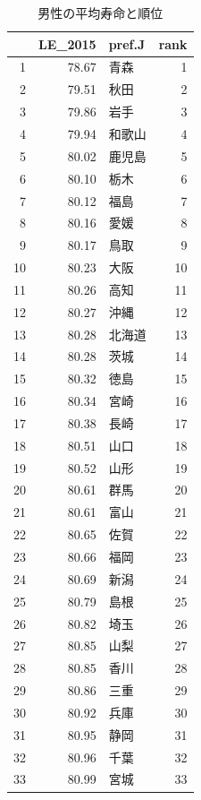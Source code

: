 \begin{table}[ht]
\caption{男性の平均寿命と順位}
\centering
\footnotesize
\begin{tabular}{rrlr}
  \hline
 & LE\_2015 & pref.J & rank \\
  \hline
1 & 78.67 & 青森 &   1 \\
  2 & 79.51 & 秋田 &   2 \\
  3 & 79.86 & 岩手 &   3 \\
  4 & 79.94 & 和歌山 &   4 \\
  5 & 80.02 & 鹿児島 &   5 \\
  6 & 80.10 & 栃木 &   6 \\
  7 & 80.12 & 福島 &   7 \\
  8 & 80.16 & 愛媛 &   8 \\
  9 & 80.17 & 鳥取 &   9 \\
  10 & 80.23 & 大阪 &  10 \\
  11 & 80.26 & 高知 &  11 \\
  12 & 80.27 & 沖縄 &  12 \\
  13 & 80.28 & 北海道 &  13 \\
  14 & 80.28 & 茨城 &  14 \\
  15 & 80.32 & 徳島 &  15 \\
  16 & 80.34 & 宮崎 &  16 \\
  17 & 80.38 & 長崎 &  17 \\
  18 & 80.51 & 山口 &  18 \\
  19 & 80.52 & 山形 &  19 \\
  20 & 80.61 & 群馬 &  20 \\
  21 & 80.61 & 富山 &  21 \\
  22 & 80.65 & 佐賀 &  22 \\
  23 & 80.66 & 福岡 &  23 \\
  24 & 80.69 & 新潟 &  24 \\
  25 & 80.79 & 島根 &  25 \\
  26 & 80.82 & 埼玉 &  26 \\
  27 & 80.85 & 山梨 &  27 \\
  28 & 80.85 & 香川 &  28 \\
  29 & 80.86 & 三重 &  29 \\
  30 & 80.92 & 兵庫 &  30 \\
  31 & 80.95 & 静岡 &  31 \\
  32 & 80.96 & 千葉 &  32 \\
  33 & 80.99 & 宮城 &  33 \\

\end{tabular}
\end{table}
